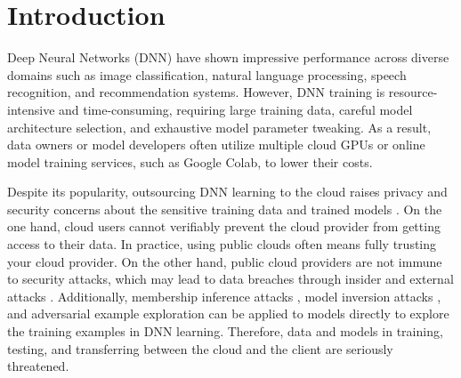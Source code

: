 \documentclass[conference]{IEEEtran}
\begin{document}
\section{Introduction}
Deep Neural Networks (DNN) have shown impressive performance across diverse domains such as image classification, natural language processing, speech recognition, and recommendation systems. However, DNN training is resource-intensive and time-consuming, requiring large training data, careful model architecture selection, and exhaustive model parameter tweaking. As a result, data owners or model developers often utilize multiple cloud GPUs or online model training services, such as Google Colab, to lower their costs. 

Despite its popularity, outsourcing DNN learning to the cloud raises privacy and security concerns about the sensitive training data and trained models \cite{sharma18ic,duncan12}.
On the one hand, cloud users cannot verifiably prevent the cloud provider from getting access to their data. In practice, using public clouds often means fully trusting your cloud provider. On the other hand, public cloud providers are not immune to security attacks, which may lead to data breaches through insider  \cite{chen10,duncan12} and external attacks \cite{mansfield15,unger15}. Additionally, membership inference attacks \cite{shokri16}, model inversion attacks \cite{fredrikson14}, and adversarial example exploration \cite{chakraborty18,raff19} can be applied to models directly to explore the training examples in DNN learning. Therefore, data and models in training, testing, and transferring between the cloud and the client are seriously threatened.
\end{document}
